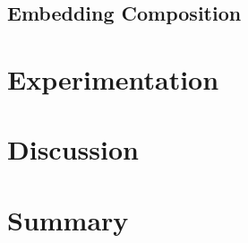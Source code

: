 
\subsection{Embedding Composition}


\section{Experimentation}
\section{Discussion}





\section{Summary}